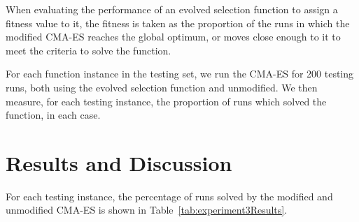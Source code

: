 \documentclass[sigconf]{acmart}
\begin{document}
When evaluating the performance of an evolved selection function to assign a fitness value to it, the fitness is taken as the proportion of the runs in which the modified CMA-ES reaches the global optimum, or moves close enough to it to meet the criteria to solve the function.

For each function instance in the testing set, we run the CMA-ES for 200 testing runs, both using the evolved selection function and unmodified. We then measure, for each testing instance, the proportion of runs which solved the function, in each case. 

\section{Results and Discussion}
\label{Results}

For each testing instance, the percentage of runs solved by the modified and unmodified CMA-ES is shown in Table~\ref{tab:experiment3Results}.
\end{document}
